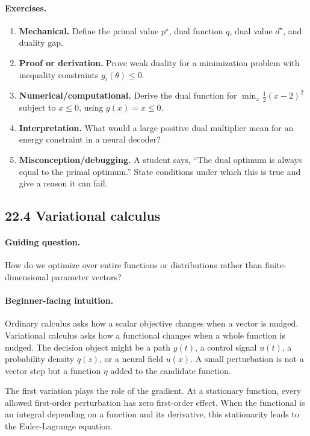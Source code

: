 \paragraph{Exercises.}
\begin{enumerate}[label=\textbf{22.3.\arabic*.}, leftmargin=*]
\item \textbf{Mechanical.} Define the primal value \(p^\star\), dual function \(q\), dual value \(d^\star\), and duality gap.
\item \textbf{Proof or derivation.} Prove weak duality for a minimization problem with inequality constraints \(g_i(\theta)\le 0\).
\item \textbf{Numerical/computational.} Derive the dual function for \(\min_x \frac12(x-2)^2\) subject to \(x\le 0\), using \(g(x)=x\le 0\).
\item \textbf{Interpretation.} What would a large positive dual multiplier mean for an energy constraint in a neural decoder?
\item \textbf{Misconception/debugging.} A student says, ``The dual optimum is always equal to the primal optimum.'' State conditions under which this is true and give a reason it can fail.
\end{enumerate}

\subsection{22.4 Variational calculus}

\paragraph{Guiding question.}
How do we optimize over entire functions or distributions rather than finite-dimensional parameter vectors?

\paragraph{Beginner-facing intuition.}
Ordinary calculus asks how a scalar objective changes when a vector is nudged. Variational calculus asks how a functional changes when a whole function is nudged. The decision object might be a path \(y(t)\), a control signal \(u(t)\), a probability density \(q(z)\), or a neural field \(u(x)\). A small perturbation is not a vector step but a function \(\eta\) added to the candidate function.

The first variation plays the role of the gradient. At a stationary function, every allowed first-order perturbation has zero first-order effect. When the functional is an integral depending on a function and its derivative, this stationarity leads to the Euler-Lagrange equation.


